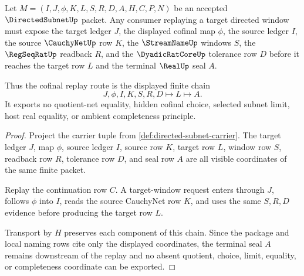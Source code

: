 \begin{theorem}
\label{thm:directed-subnet-cofinal-replay}
Let $M=(I,J,\phi,K,L,S,R,D,A,H,C,P,N)$ be an accepted $\DirectedSubnetUp$ packet. Any consumer replaying a target directed window must expose the target ledger $J$, the displayed cofinal map $\phi$, the source ledger $I$, the source $\CauchyNetUp$ row $K$, the $\StreamNameUp$ windows $S$, the $\RegSeqRatUp$ readback $R$, and the $\DyadicRatCoreUp$ tolerance row $D$ before it reaches the target row $L$ and the terminal $\RealUp$ seal $A$.

Thus the cofinal replay route is the displayed finite chain
$$
J,\phi,I,K,S,R,D \longmapsto L \longmapsto A .
$$
It exports no quotient-net equality, hidden cofinal choice, selected subnet limit, host real equality, or ambient completeness principle.
\end{theorem}
\begin{proof}
Project the carrier tuple from \autoref{def:directed-subnet-carrier}. The target ledger $J$, map $\phi$, source ledger $I$, source row $K$, target row $L$, window row $S$, readback row $R$, tolerance row $D$, and seal row $A$ are all visible coordinates of the same finite packet.

Replay the continuation row $C$. A target-window request enters through $J$, follows $\phi$ into $I$, reads the source CauchyNet row $K$, and uses the same $S,R,D$ evidence before producing the target row $L$.

Transport by $H$ preserves each component of this chain. Since the package and local naming rows cite only the displayed coordinates, the terminal seal $A$ remains downstream of the replay and no absent quotient, choice, limit, equality, or completeness coordinate can be exported.
\end{proof}

